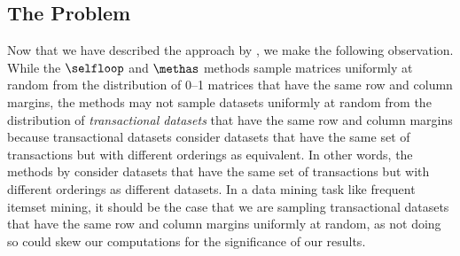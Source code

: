\subsection{The Problem}

Now that we have described the approach by \citet{GionisMMT07}, we make the
following observation. While the $\selfloop$ and $\methas$ methods sample
matrices uniformly at random from the distribution of 0--1 matrices that have
the same row and column margins, the methods may not sample datasets uniformly
at random from the distribution of \textit{transactional datasets} that have
the same row and column margins because transactional datasets consider
datasets that have the same set of transactions but with different orderings as
equivalent.  In other words, the methods by \citet{GionisMMT07} consider
datasets that have the same set of transactions but with different orderings as
different datasets. In a data mining task like frequent itemset mining, it
should be the case that we are sampling transactional datasets that have the
same row and column margins uniformly at random, as not doing so could skew our
computations for the significance of our results.


